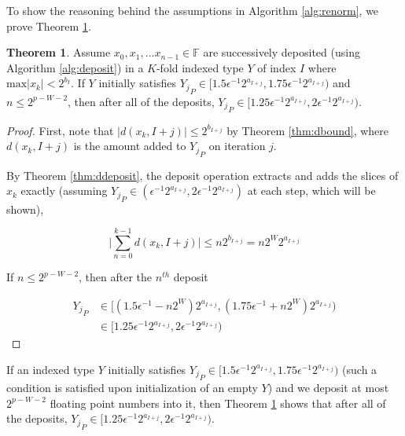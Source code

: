 \documentclass[12pt]{article}
\providecommand{\F}{\ensuremath{\mathbb{F}}}
\providecommand{\max}{\ensuremath{\text{max}}}
\theoremstyle{definition}
\newtheorem{thm}{Theorem}[section]
\numberwithin{equation}{section}
\numberwithin{figure}{section}
\begin{document}
    To show the reasoning behind the assumptions in Algorithm \ref{alg:renorm}, we prove Theorem \ref{thm:renormfreq}.

      \begin{samepage}
    \begin{thm}
      Assume $x_0, x_1, ... x_{n - 1} \in \F$ are successively deposited (using Algorithm \ref{alg:deposit}) in a $K$-fold indexed type $Y$ of index $I$ where $\max|x_k| < 2^{b_I}$. If $Y$ initially satisfies ${Y_j}_P \in [1.5  \epsilon^{-1} 2^{a_{I + j}}, 1.75  \epsilon^{-1} 2^{a_{I + j}})$ and $n \leq 2^{p - W - 2}$, then after all of the deposits, ${Y_j}_P \in [1.25  \epsilon^{-1} 2^{a_{I + j}}, 2  \epsilon^{-1} 2^{a_{I + j}})$.
      \label{thm:renormfreq}
    \end{thm}
    \end{samepage}

    \begin{proof}
    First, note that $|d(x_k, I + j)| \leq 2^{b_{I + j}}$ by Theorem \ref{thm:dbound}, where $d(x_k, I + j)$ is the amount added to ${Y_j}_P$ on iteration $j$.

    By Theorem \ref{thm:ddeposit}, the deposit operation extracts and adds the slices of $x_k$ exactly (assuming ${Y_j}_P \in (\epsilon^{-1} 2^{a_{I + j}}, 2  \epsilon^{-1} 2^{a_{I + j}})$ at each step, which will be shown),

    \begin{equation*}
    \bigl|\sum \limits_{n = 0}^{k - 1} d(x_k, I + j)\bigr| \leq n  2^{b_{I + j}} = n  2^{W}  2^{a_{I + j}}
    \end{equation*}

    If $n \leq 2^{p - W - 2}$, then after the $n^{th}$ deposit

    \begin{align*}
    {Y_j}_P &\in \bigl[(1.5  \epsilon^{-1} - n  2^W) 2^{a_{I + j}}, (1.75  \epsilon^{-1} + n  2^W) 2^{a_{I + j}}\bigr) \\
    &\in [1.25  \epsilon^{-1} 2^{a_{I + j}}, 2  \epsilon^{-1} 2^{a_{I + j}})
    \end{align*}
    \end{proof}

    If an indexed type $Y$ initially satisfies ${Y_j}_P \in [1.5  \epsilon^{-1} 2^{a_{I + j}}, 1.75  \epsilon^{-1} 2^{a_{I + j}})$ (such a condition is satisfied upon initialization of an empty $Y$) and we deposit at most $2^{p - W - 2}$ floating point numbers into it, then Theorem \ref{thm:renormfreq} shows that after all of the deposits, ${Y_j}_P \in [1.25  \epsilon^{-1} 2^{a_{I + j}}, 2  \epsilon^{-1} 2^{a_{I + j}})$.
\end{document}
